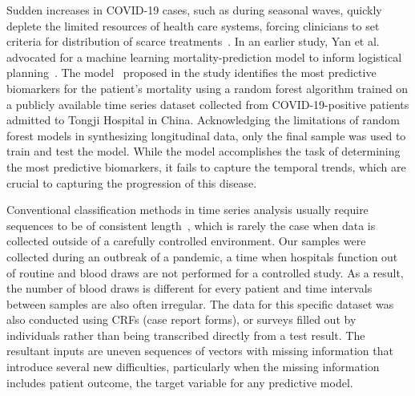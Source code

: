 Sudden increases in COVID-19 cases, such as during seasonal waves, quickly deplete the limited resources of health care systems, forcing clinicians to set criteria for distribution of scarce treatments~\cite{centersstrategies}. In an earlier study, Yan et al. advocated for a machine learning mortality-prediction model to inform logistical planning~\cite{yan2020interpretable}. The model~\cite{yan2020interpretable} proposed in the study identifies the most predictive biomarkers for the patient's mortality using a random forest algorithm trained on a publicly available time series dataset collected from COVID-19-positive patients admitted to Tongji Hospital in China. Acknowledging the limitations of random forest models in synthesizing longitudinal data, only the final sample was used to train and test the model. While the model accomplishes the task of determining the most predictive biomarkers, it fails to capture the temporal trends, which are crucial to capturing the progression of this disease. 

Conventional classification methods in time series analysis usually require sequences to be of consistent length~\cite{lu2018predicting}, which is rarely the case when data is collected outside of a carefully controlled environment. Our samples were collected during an outbreak of a pandemic, a time when hospitals function out of routine and blood draws are not performed for a controlled study. As a result, the number of blood draws is different for every patient and  time intervals between samples are also often irregular. The data for this specific dataset was also conducted using CRFs (case report forms), or surveys filled out by individuals rather than being transcribed directly from a test result. The resultant inputs are uneven sequences of vectors with missing information that introduce several new difficulties, particularly when the missing information includes patient outcome, the target variable for any predictive model.

